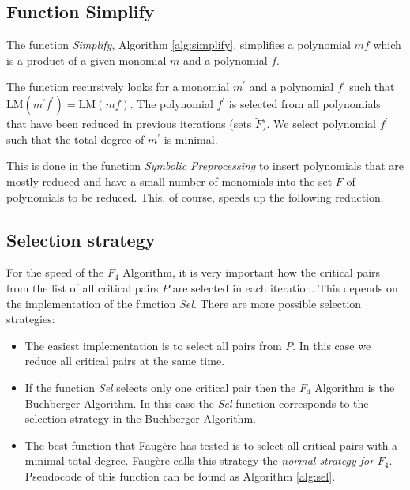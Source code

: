 

\subsection{Function Simplify}
The function \textit{Simplify}, Algorithm \ref{alg:simplify}, simplifies a polynomial $m f$ which is a product of a given monomial $m$ and a polynomial $f$.

The function recursively looks for a monomial $m^\prime$ and a polynomial $f^\prime$ such that $\textrm{LM}(m^\prime f^\prime) = \textrm{LM}(m f)$. The polynomial $f^\prime$ is selected from all polynomials that have been reduced in previous iterations (sets $\tilde{F}$). We select polynomial $f^\prime$ such that the total degree of $m^\prime$ is minimal.

This is done in the function \textit{Symbolic Preprocessing} to insert polynomials that are mostly reduced and have a small number of monomials into the set $F$ of polynomials to be reduced. This, of course, speeds up the following reduction.



\subsection{Selection strategy}
\label{subsec:F4:sel}
For the speed of the $F_4$ Algorithm, it is very important how the critical pairs from the list of all critical pairs $P$ are selected in each iteration. This depends on the implementation of the function \textit{Sel}. There are more possible selection strategies:

\begin{itemize}
  \item The easiest implementation is to select all pairs from $P$. In this case we reduce all critical pairs at the same time.
  \item If the function \textit{Sel} selects only one critical pair then the $F_4$ Algorithm is the Buchberger Algorithm. In this case the \textit{Sel} function corresponds to the selection strategy in the Buchberger Algorithm.
  \item The best function that Faug\`ere has tested is to select all critical pairs with a minimal total degree. Faug\`ere calls this strategy the \textit{normal strategy for} $F_4$. Pseudocode of this function can be found as Algorithm \ref{alg:sel}.
\end{itemize}

